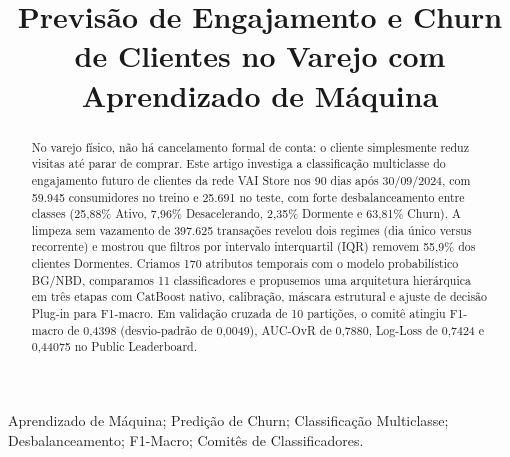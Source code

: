 \documentclass[10pt, conference, compsocconf]{IEEEtran}
\begin{document}
\title{Previsão de Engajamento e Churn de Clientes no Varejo com Aprendizado de Máquina}

\author{%
\and
{}
}

\maketitle

\begin{abstract}
No varejo físico, não há cancelamento formal de conta: o cliente simplesmente reduz visitas até parar de comprar. Este artigo investiga a classificação multiclasse do engajamento futuro de clientes da rede VAI Store nos 90 dias após 30/09/2024, com 59.945 consumidores no treino e 25.691 no teste, com forte desbalanceamento entre classes (25,88\% Ativo, 7,96\% Desacelerando, 2,35\% Dormente e 63,81\% Churn). A limpeza sem vazamento de 397.625 transações revelou dois regimes (dia único versus recorrente) e mostrou que filtros por intervalo interquartil (IQR) removem 55,9\% dos clientes Dormentes. Criamos 170 atributos temporais com o modelo probabilístico BG/NBD, comparamos 11 classificadores e propusemos uma arquitetura hierárquica em três etapas com CatBoost nativo, calibração, máscara estrutural e ajuste de decisão Plug-in para F1-macro. Em validação cruzada de 10 partições, o comitê atingiu F1-macro de 0,4398 (desvio-padrão de 0,0049), AUC-OvR de 0,7880, Log-Loss de 0,7424 e 0,44075 no Public Leaderboard.
\end{abstract}

\begin{IEEEkeywords}
Aprendizado de Máquina; Predição de Churn; Classificação Multiclasse; Desbalanceamento; F1-Macro; Comitês de Classificadores.
\end{IEEEkeywords}
\end{document}
